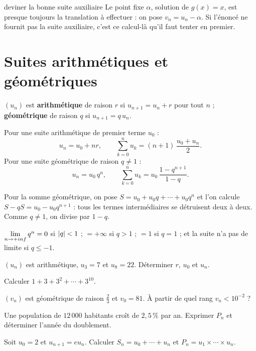 \begin{methode}{deviner la bonne suite auxiliaire}
Le point fixe $\alpha$, solution de $g(x) = x$, est presque toujours la
translation à effectuer : on pose $v_{n} = u_{n}-\alpha$. Si l'énoncé ne
fournit pas la suite auxiliaire, c'est ce calcul-là qu'il faut tenter en
premier.
\end{methode}

\section{Suites arithmétiques et géométriques}

\begin{definition}
$(u_{n})$ est \textbf{arithmétique} de raison $r$ si $u_{n+1} = u_{n}+r$ pour
tout $n$ ; \textbf{géométrique} de raison $q$ si $u_{n+1} = q\,u_{n}$.
\end{definition}

\begin{propriete}
Pour une suite arithmétique de premier terme $u_{0}$ :
\[
  u_{n} = u_{0}+nr, \qquad
  \sum_{k=0}^{n}u_{k} = (n+1)\,\frac{u_{0}+u_{n}}{2}.
\]
Pour une suite géométrique de raison $q \neq 1$ :
\[
  u_{n} = u_{0}\,q^{n}, \qquad
  \sum_{k=0}^{n}u_{k} = u_{0}\,\frac{1-q^{n+1}}{1-q}.
\]
\end{propriete}

\begin{demonstration}
Pour la somme géométrique, on pose $S = u_{0}+u_{0}q+\cdots+u_{0}q^{n}$ et
l'on calcule $S-qS = u_{0}-u_{0}q^{n+1}$ : tous les termes intermédiaires se
détruisent deux à deux. Comme $q \neq 1$, on divise par $1-q$.
\end{demonstration}

\begin{propriete}
$\limn q^{n} = 0$ si $\left|q\right|<1$ ; $=+\infty$ si $q>1$ ; $=1$ si $q = 1$ ; et
la suite n'a pas de limite si $q \leq -1$.
\end{propriete}

\begin{entrainement}
\exo[\niveau{1}] $(u_{n})$ est arithmétique, $u_{3} = 7$ et $u_{8} = 22$.
Déterminer $r$, $u_{0}$ et $u_{n}$.

\exo[\niveau{1}] Calculer $1+3+3^{2}+\cdots+3^{10}$.

\exo[\niveau{2}] $(v_{n})$ est géométrique de raison $\frac23$ et
$v_{0} = 81$. À partir de quel rang $v_{n}<10^{-2}$ ?

\exo[\niveau{2}] Une population de $12\,000$ habitants croît de $2{,}5\,\%$
par an. Exprimer $P_{n}$ et déterminer l'année du doublement.

\exo[\niveau{3}] Soit $u_{0} = 2$ et $u_{n+1} = eu_{n}$. Calculer
$S_{n} = u_{0}+\cdots+u_{n}$ et $P_{n} = u_{1}\times\cdots\times u_{n}$.
\end{entrainement}

